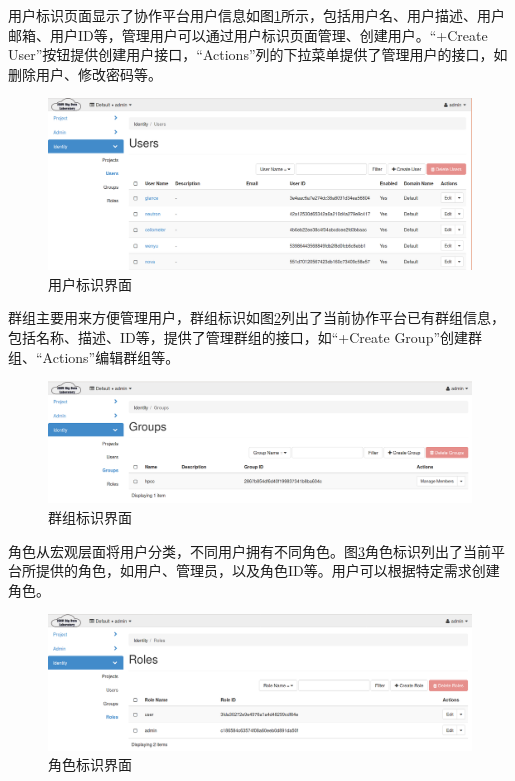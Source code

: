 \documentclass[12pt]{ctexart}%
\begin{document}
用户标识页面显示了协作平台用户信息如图\ref{fig:identityusers}所示，包括用户名、用户描述、用户邮箱、用户ID等，管理用户可以通过用户标识页面管理、创建用户。“+Create User”按钮提供创建用户接口，“Actions”列的下拉菜单提供了管理用户的接口，如删除用户、修改密码等。
\begin{figure}[!htb]
\centering
\includegraphics[width=6in]{./figures/Identity_Users}
\caption{用户标识界面}
\label{fig:identityusers}
\end{figure}
群组主要用来方便管理用户，群组标识如图\ref{fig:identitygroups}列出了当前协作平台已有群组信息，包括名称、描述、ID等，提供了管理群组的接口，如“+Create Group”创建群组、“Actions”编辑群组等。
\begin{figure}[!htb]
\centering
\includegraphics[width=6in]{./figures/Identity_Groups}
\caption{群组标识界面}
\label{fig:identitygroups}
\end{figure}
角色从宏观层面将用户分类，不同用户拥有不同角色。图\ref{fig:identityroles}角色标识列出了当前平台所提供的角色，如用户、管理员，以及角色ID等。用户可以根据特定需求创建角色。
\begin{figure}[!htb]
\centering
\includegraphics[width=6in]{./figures/Identity_Roles}
\caption{角色标识界面}
\label{fig:identityroles}
\end{figure}
\end{document}
